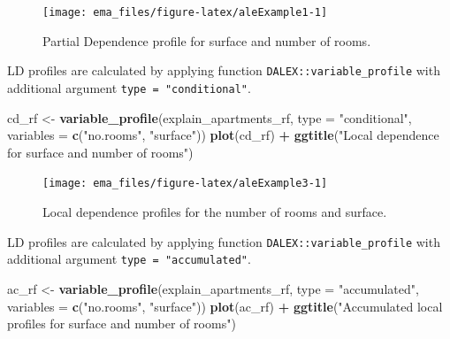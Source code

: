\documentclass[]{krantz}
\newenvironment{Shaded}{\begin{snugshade}}{\end{snugshade}}
\newcommand{\DataTypeTok}[1]{\textcolor[rgb]{0.13,0.29,0.53}{#1}}
\newcommand{\KeywordTok}[1]{\textcolor[rgb]{0.13,0.29,0.53}{\textbf{#1}}}
\newcommand{\NormalTok}[1]{#1}
\newcommand{\OperatorTok}[1]{\textcolor[rgb]{0.81,0.36,0.00}{\textbf{#1}}}
\newcommand{\StringTok}[1]{\textcolor[rgb]{0.31,0.60,0.02}{#1}}
\begin{document}
\begin{figure}

{\centering \texttt{[image: ema\_files/figure-latex/aleExample1-1]} 

}

\caption{Partial Dependence profile for surface and number of rooms.}\label{fig:aleExample1}
\end{figure}

LD profiles are calculated by applying function \texttt{DALEX::variable\_profile} with additional argument \texttt{type\ =\ "conditional"}.

\begin{Shaded}
\begin{Highlighting}[]
\NormalTok{cd_rf <-}\StringTok{ }\KeywordTok{variable_profile}\NormalTok{(explain_apartments_rf,}
                          \DataTypeTok{type =} \StringTok{"conditional"}\NormalTok{,}
                          \DataTypeTok{variables =} \KeywordTok{c}\NormalTok{(}\StringTok{"no.rooms"}\NormalTok{, }\StringTok{"surface"}\NormalTok{))}
\KeywordTok{plot}\NormalTok{(cd_rf) }\OperatorTok{+}
\StringTok{  }\KeywordTok{ggtitle}\NormalTok{(}\StringTok{"Local dependence for surface and number of rooms"}\NormalTok{) }
\end{Highlighting}
\end{Shaded}

\begin{figure}

{\centering \texttt{[image: ema\_files/figure-latex/aleExample3-1]} 

}

\caption{Local dependence profiles for the number of rooms and surface.}\label{fig:aleExample3}
\end{figure}

LD profiles are calculated by applying function \texttt{DALEX::variable\_profile} with additional argument \texttt{type\ =\ "accumulated"}.

\begin{Shaded}
\begin{Highlighting}[]
\NormalTok{ac_rf <-}\StringTok{ }\KeywordTok{variable_profile}\NormalTok{(explain_apartments_rf,}
                          \DataTypeTok{type =} \StringTok{"accumulated"}\NormalTok{,}
                          \DataTypeTok{variables =} \KeywordTok{c}\NormalTok{(}\StringTok{"no.rooms"}\NormalTok{, }\StringTok{"surface"}\NormalTok{))}
\KeywordTok{plot}\NormalTok{(ac_rf) }\OperatorTok{+}
\StringTok{  }\KeywordTok{ggtitle}\NormalTok{(}\StringTok{"Accumulated local profiles for surface and number of rooms"}\NormalTok{) }
\end{Highlighting}
\end{Shaded}
\end{document}
